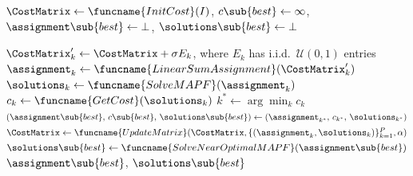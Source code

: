 {
%
\begin{algorithm}[t!]
\caption{TACT}
\label{algo:framework}
%
\begin{algorithmic}[1]
\small
{}
%
\State $\CostMatrix \leftarrow \funcname{InitCost}(I)$,\;
$c\sub{best} \leftarrow \infty$,\;
$\assignment\sub{best} \leftarrow \bot$,\;
$\solutions\sub{best} \leftarrow \bot$
\label{algo:framework:init}

%
\label{algo:framework:parallel}
\State $\CostMatrix'_k \leftarrow \CostMatrix + \sigma E_k$,
where $E_k$ has i.i.d.\ $\mathcal{U}(0, 1)$ entries
\label{algo:framework:noise}
\State $\assignment_k \leftarrow \funcname{LinearSumAssignment}(\CostMatrix'_k)$
\label{algo:framework:linear_assignment_with_noise}
\State $\solutions_k \leftarrow \funcname{SolveMAPF}(\assignment_k)$
\label{algo:framework:mapf}
\State $c_k \leftarrow \funcname{GetCost}(\solutions_k)$
\label{algo:framework:getcost}
\EndFor
%
\State $k^\ast \leftarrow \arg\min_k c_k$
\label{algo:framework:argmin}
\State $(\assignment\sub{best},\, c\sub{best},\, \solutions\sub{best})
 \leftarrow (\assignment_{k^\ast},\, c_{k^\ast},\, \solutions_{k^\ast})$
\label{algo:framework:track}
\EndIf
\State $\CostMatrix \leftarrow \funcname{UpdateMatrix}(\CostMatrix, \{(\assignment_k, \solutions_k)\}_{k=1}^{P}, \alpha)$
\label{algo:framework:update}
\EndWhile
%
\State $\solutions\sub{best} \leftarrow \funcname{SolveNearOptimalMAPF}(\assignment\sub{best})$
\label{algo:framework:path-opt}
%
\State \Return $\assignment\sub{best}$, $\solutions\sub{best}$
\end{algorithmic}
\end{algorithm}
}